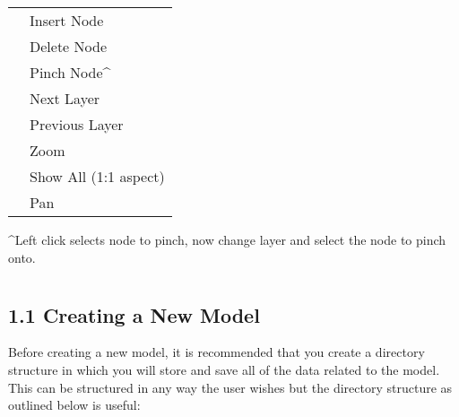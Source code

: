 \documentclass[a4paper,12pt,english]{sphinxmanual}
\begin{document}
\section{}
\label{\detokenize{manual__keyboard_shortcuts::doc}}\label{\detokenize{manual__keyboard_shortcuts:keyboard-shortcuts}}\label{\detokenize{manual__keyboard_shortcuts:keys}}

\begin{savenotes}\sphinxattablestart
\centering
\begin{tabulary}{\linewidth}[t]{|T|T|}
\hline
{}\relax &\relax \\
\hline
{}
&
Insert Node
\\
\hline
{}
&
Delete Node
\\
\hline
{}
&
Pinch Node\textasciicircum{}
\\
\hline
\sphinxstylestrong{\textgreater{}}
&
Next Layer
\\
\hline
\sphinxstylestrong{\textless{}}
&
Previous Layer
\\
\hline
{}
&
Zoom
\\
\hline
{}
&
Show All (1:1 aspect)
\\
\hline
{}
&
Pan
\\
\hline
\end{tabulary}
\par
\sphinxattableend\end{savenotes}

\textasciicircum{}Left click selects node to pinch, now change layer and select the node to pinch onto.


\section{}
\label{\detokenize{manual__models:models}}\label{\detokenize{manual__models::doc}}
\begin{DUlineblock}{0em}
\item[] 
\end{DUlineblock}


\subsection{1.1 Creating a New Model}
\label{\detokenize{manual__models:creating-a-new-model}}
Before creating a new model, it is recommended that you create a directory structure in which you will store and save
all of the data related to the model. This can be structured in any way the user wishes but the directory structure
as outlined below is useful:
\end{document}
